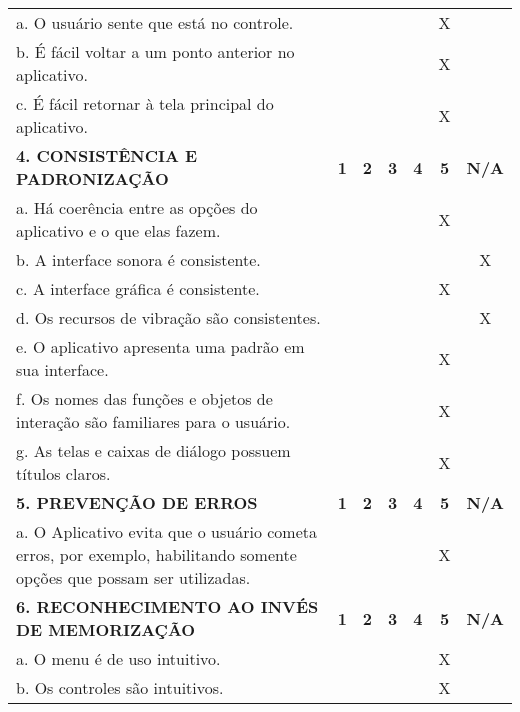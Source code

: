 \documentclass[portuguese,oneside]{tcc}
\begin{document}
\begin{center}
\begin{longtabu}{|L{25em}|c|c|c|c|c|c|}
																																a. O usuário sente que está no controle. & & & & & X & \\ 
																																b. É fácil voltar a um ponto anterior no aplicativo. & & & & & X & \\ 
																																c. É fácil retornar à tela principal do aplicativo. & & & & & X & \\ 
																																\textbf{4. CONSISTÊNCIA E PADRONIZAÇÃO} & \textbf{1} & \textbf{2} & \textbf{3} & \textbf{4} & \textbf{5} & \textbf{N/A} \\ 
																																a. Há coerência entre as opções do aplicativo e o que elas fazem. & & & & & X & \\ 
																																b. A interface sonora é consistente. & & & & & & X \\ 
																																c. A interface gráfica é consistente. & & & & & X & \\ 
																																d. Os recursos de vibração são consistentes. & & & & & & X \\ 
																																e. O aplicativo apresenta uma padrão em sua interface. & & & & & X & \\ 
																																f. Os nomes das funções e objetos de interação são familiares para o usuário. & & & & & X & \\ 
																																g. As telas e caixas de diálogo possuem títulos claros. & & & & & X & \\ 
																																\textbf{5. PREVENÇÃO DE ERROS} & \textbf{1} & \textbf{2} & \textbf{3} & \textbf{4} & \textbf{5} & \textbf{N/A} \\ 
																																a. O Aplicativo evita que o usuário cometa erros, por exemplo, habilitando somente opções que possam ser utilizadas. & & & & & X & \\ 
																																\textbf{6. RECONHECIMENTO AO INVÉS DE MEMORIZAÇÃO} & \textbf{1} & \textbf{2} & \textbf{3} & \textbf{4} & \textbf{5} & \textbf{N/A} \\ 
																																a. O  menu é de uso intuitivo. & & & & & X & \\ 
																																b. Os controles são intuitivos. & & & & & X & \\ 

\end{longtabu}
\end{center}
\end{document}
